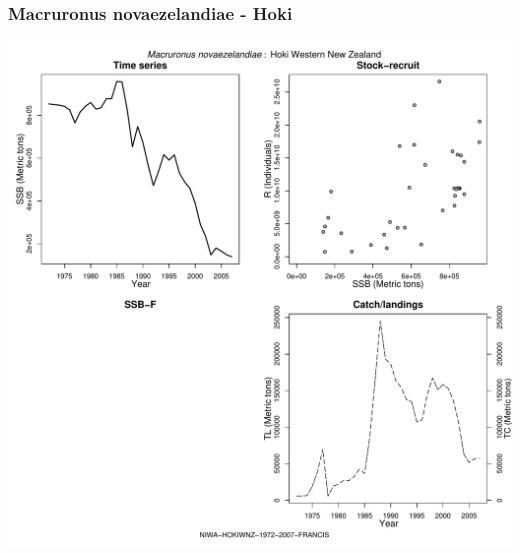 \subsubsection{Macruronus novaezelandiae - Hoki}
\begin{center}
\includegraphics[width=1.2\textwidth]{../R/figures/NIWA-HOKIWNZ-1972-2007-FRANCIS.pdf}
\end{center}

